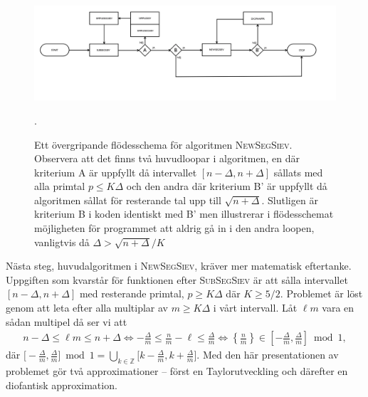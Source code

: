 \begin{figure}
    \centering
    \includegraphics[width = \textwidth]{erik/Images/flowchart_v2.1.png}
    
    \caption{Ett övergripande flödesschema för algoritmen \textsc{NewSegSiev}. Observera att det finns två huvudloopar i algoritmen, en där kriterium A är uppfyllt då intervallet \([n - \Delta, n + \Delta]\) sållats med alla primtal \(p \leq K \Delta\) och den andra där kriterium B' är uppfyllt då algoritmen sållat för resterande tal upp till \(\sqrt{n + \Delta}\). Slutligen är kriterium B i koden identiskt med B' men illustrerar i flödesschemat möjligheten för programmet att aldrig gå in i den andra loopen, vanligtvis då \(\Delta > \sqrt{n + \Delta}/K\)}.
    \label{fig:flowchart}
\end{figure}



Nästa steg, huvudalgoritmen i \textsc{NewSegSiev}, kräver mer matematisk eftertanke. Uppgiften som kvarstår för funktionen efter \textsc{SubSegSiev} är att sålla intervallet \([n - \Delta, n + \Delta]\) med resterande primtal, \( p \geq K \Delta\) där \(K \geq 5/2\). Problemet är löst genom att leta efter alla multiplar av \(m \geq K \Delta\) i vårt intervall. Låt \(\ell m\) vara en sådan multipel då ser vi att
\begin{align} \label{alg.problem}
    n - \Delta \leq \ell m \leq n + \Delta \Longleftrightarrow - \frac{\Delta}{m} \leq \frac{n}{m} - \ell \leq \frac{\Delta}{m} \Longleftrightarrow \left\{ \frac{n}{m} \right\} \in \left[- \frac{\Delta}{m}, \frac{\Delta}{m} \right] \bmod 1,
\end{align}
där $\big[- \frac{\Delta}{m}, \frac{\Delta}{m} \big] \bmod 1 = \bigcup_{k \in \mathbb{Z}} \big[k - \frac{\Delta}{m}, k + \frac{\Delta}{m} \big]$. Med den här presentationen av problemet gör \cite{HaraldSieve} två approximationer -- först en Taylorutveckling och därefter en diofantisk approximation. 

